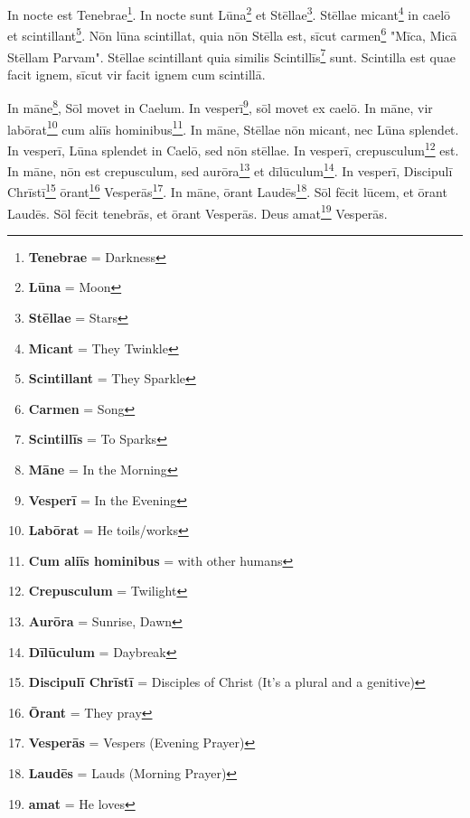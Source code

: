 In nocte est Tenebrae\footnote{\textbf{Tenebrae} = Darkness}. In nocte sunt Lūna\footnote{\textbf{Lūna} = Moon} et Stēllae\footnote{\textbf{Stēllae} = Stars}. Stēllae micant\footnote{\textbf{Micant} = They Twinkle} in caelō et scintillant\footnote{\textbf{Scintillant} = They Sparkle}. Nōn lūna scintillat, quia nōn Stēlla est, sīcut carmen\footnote{\textbf{Carmen} = Song} "Mīca, Micā Stēllam Parvam". Stēllae scintillant quia similis Scintillīs\footnote{\textbf{Scintillīs} = To Sparks} sunt. Scintilla est quae facit ignem, sīcut vir facit ignem cum scintillā. \par
In māne\footnote{\textbf{Māne} = In the Morning}, Sōl movet in Caelum. In vesperī\footnote{\textbf{Vesperī} = In the Evening}, sōl movet ex caelō. In māne, vir labōrat\footnote{\textbf{Labōrat} = He toils/works} cum aliīs hominibus\footnote{\textbf{Cum aliīs hominibus} = with other humans}. In māne, Stēllae nōn micant, nec Lūna splendet. In vesperī, Lūna splendet in Caelō, sed nōn stēllae. In vesperī, crepusculum\footnote{\textbf{Crepusculum} = Twilight} est. In māne, nōn est crepusculum, sed aurōra\footnote{\textbf{Aurōra} = Sunrise, Dawn} et dīlūculum\footnote{\textbf{Dīlūculum} = Daybreak}. In vesperī, Discipulī Chrīstī\footnote{\textbf{Discipulī Chrīstī} = Disciples of Christ (It's a plural and a genitive)} ōrant\footnote{\textbf{Ōrant} = They pray} Vesperās\footnote{\textbf{Vesperās} = Vespers (Evening Prayer)}. In māne, ōrant Laudēs\footnote{\textbf{Laudēs} = Lauds (Morning Prayer)}. Sōl fēcit lūcem, et ōrant Laudēs. Sōl fēcit tenebrās, et ōrant Vesperās. Deus amat\footnote{\textbf{amat} = He loves} Vesperās.\par